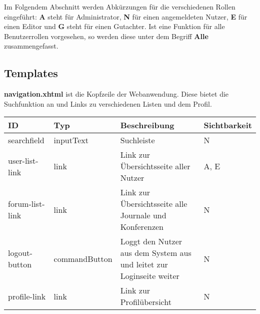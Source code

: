 \newcommand{\ftable}[1]{\begin{longtable}[H]{|m{2cm}|m{3cm}|m{6cm}|m{2.5cm}|}
                            \hline
                            \textbf{ID} & \textbf{Typ} & \textbf{Beschreibung} & \textbf{Sichtbarkeit} \\
                            \hline
                            \hline
                            #1
\end{longtable}
}

\newcommand{\fentry}[4]{#1 & #2 & #3 & #4 \\
\hline}



Im Folgendem Abschnitt werden Abkürzungen für die verschiedenen Rollen eingeführt:
\textbf{A} steht für Administrator, \textbf{N} für einen angemeldeten Nutzer, \textbf{E} für einen Editor und \textbf{G} steht für einen Gutachter.
Ist eine Funktion für alle Benutzerrollen vorgesehen, so werden diese unter dem Begriff \textbf{Alle} zusammengefasst.



\subsection{Templates}



\begin{samepage}
    \textbf{navigation.xhtml} ist die Kopfzeile der Webanwendung. Diese bietet die Suchfunktion an und Links zu verschiedenen Listen und dem Profil.
    \nopagebreak

    \ftable{
        \fentry{searchfield}{inputText}{Suchleiste}{N }

        \fentry{user-list-link}{link}{Link zur Übersichtsseite aller Nutzer}{A, E }

        \fentry{forum-list-link}{link}{Link zur Übersichtsseite alle Journale und Konferenzen}{N }

        \fentry{logout-button}{commandButton}{Loggt den Nutzer aus dem System aus und leitet zur Loginseite weiter}{N }

        \fentry{profile-link}{link}{Link zur Profilübersicht}{N }

    }
\end{samepage}

